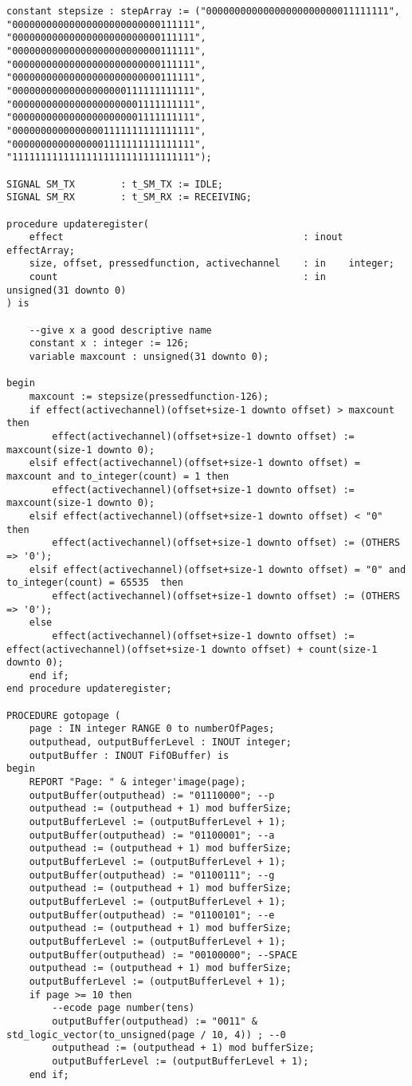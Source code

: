\begin{lstlisting}
constant stepsize : stepArray := ("00000000000000000000000011111111", "00000000000000000000000000111111", "00000000000000000000000000111111", "00000000000000000000000000111111", "00000000000000000000000000111111", "00000000000000000000000000111111", "00000000000000000000111111111111", "00000000000000000000001111111111", "00000000000000000000001111111111", "00000000000000001111111111111111", "00000000000000001111111111111111", "11111111111111111111111111111111");

SIGNAL SM_TX 		: t_SM_TX := IDLE;
SIGNAL SM_RX 		: t_SM_RX := RECEIVING;

procedure updateregister(
	effect 											: inout effectArray;
	size, offset, pressedfunction, activechannel	: in 	integer;
	count											: in	unsigned(31 downto 0)
) is

	--give x a good descriptive name
	constant x : integer := 126;
	variable maxcount : unsigned(31 downto 0);

begin
	maxcount := stepsize(pressedfunction-126);
 	if effect(activechannel)(offset+size-1 downto offset) > maxcount  then
		effect(activechannel)(offset+size-1 downto offset) := maxcount(size-1 downto 0);
	elsif effect(activechannel)(offset+size-1 downto offset) = maxcount and to_integer(count) = 1 then
		effect(activechannel)(offset+size-1 downto offset) := maxcount(size-1 downto 0);
	elsif effect(activechannel)(offset+size-1 downto offset) < "0" then
		effect(activechannel)(offset+size-1 downto offset) := (OTHERS => '0');
	elsif effect(activechannel)(offset+size-1 downto offset) = "0" and to_integer(count) = 65535  then
		effect(activechannel)(offset+size-1 downto offset) := (OTHERS => '0');
	else
		effect(activechannel)(offset+size-1 downto offset) := effect(activechannel)(offset+size-1 downto offset) + count(size-1 downto 0);
 	end if;
end procedure updateregister;

PROCEDURE gotopage (
	page : IN integer RANGE 0 to numberOfPages;
	outputhead, outputBufferLevel : INOUT integer;
	outputBuffer : INOUT FifOBuffer) is
begin
	REPORT "Page: " & integer'image(page);
	outputBuffer(outputhead) := "01110000"; --p
	outputhead := (outputhead + 1) mod bufferSize;
	outputBufferLevel := (outputBufferLevel + 1);
	outputBuffer(outputhead) := "01100001"; --a
	outputhead := (outputhead + 1) mod bufferSize;
	outputBufferLevel := (outputBufferLevel + 1);
	outputBuffer(outputhead) := "01100111"; --g
	outputhead := (outputhead + 1) mod bufferSize;
	outputBufferLevel := (outputBufferLevel + 1);
	outputBuffer(outputhead) := "01100101"; --e
	outputhead := (outputhead + 1) mod bufferSize;
	outputBufferLevel := (outputBufferLevel + 1);
	outputBuffer(outputhead) := "00100000"; --SPACE
	outputhead := (outputhead + 1) mod bufferSize;
	outputBufferLevel := (outputBufferLevel + 1);
	if page >= 10 then
		--ecode page number(tens)
		outputBuffer(outputhead) := "0011" & std_logic_vector(to_unsigned(page / 10, 4)) ; --0
		outputhead := (outputhead + 1) mod bufferSize;
		outputBufferLevel := (outputBufferLevel + 1);
	end if;


\end{lstlisting}
